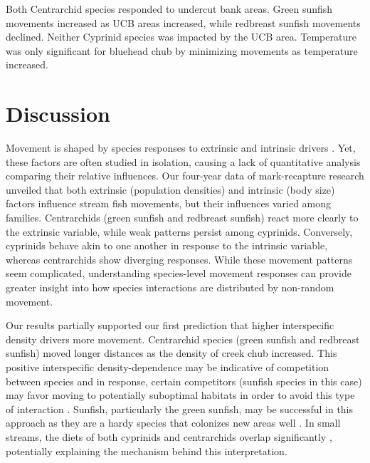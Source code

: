\documentclass[11pt, class=article, crop=false]{standalone}
\begin{document}
Both Centrarchid species responded to undercut bank areas. Green sunfish movements increased as UCB areas increased, while redbreast sunfish movements declined. Neither Cyprinid species was impacted by the UCB area. Temperature was only significant for bluehead chub by minimizing movements as temperature increased. 

\section{Discussion}

Movement is shaped by species responses to extrinsic and intrinsic drivers \citep{clobertDispersalEcologyEvolution2012}. Yet, these factors are often studied in isolation, causing a lack of quantitative analysis comparing their relative influences. Our four-year data of mark-recapture research unveiled that both extrinsic (population densities) and intrinsic (body size) factors influence stream fish movements, but their influences varied among families. Centrarchids (green sunfish and redbreast sunfish) react more clearly to the extrinsic variable, while weak patterns persist among cyprinids. Conversely, cyprinids behave akin to one another in response to the intrinsic variable, whereas centrarchids show diverging responses. While these movement patterns seem complicated, understanding species-level movement responses can provide greater insight into how species interactions are distributed by non-random movement. 

Our results partially supported our first prediction that higher interspecific density drivers more movement. Centrarchid species (green sunfish and redbreast sunfish) moved longer distances as the density of creek chub increased. This positive interspecific density-dependence may be indicative of competition between species and in response, certain competitors (sunfish species in this case) may favor moving to potentially suboptimal habitats in order to avoid this type of interaction \citep{jacobHabitatChoiceMeets2018, thierryInterplayAbioticBiotic2024}. Sunfish, particularly the green sunfish, may be successful in this approach as they are a hardy species that colonizes new areas well \citep{lemlySuppressionNativeFish1985, moyel 2002}. In small streams, the diets of both cyprinids and centrarchids overlap significantly \citep{collarPISCIVORYLIMITSDIVERSIFICATION2009, lemlySuppressionNativeFish1985, karrAssessmentBioticIntegrity1981, leonardApplicationTestingIndex1986}, potentially explaining the mechanism behind this interpretation.  
\end{document}
